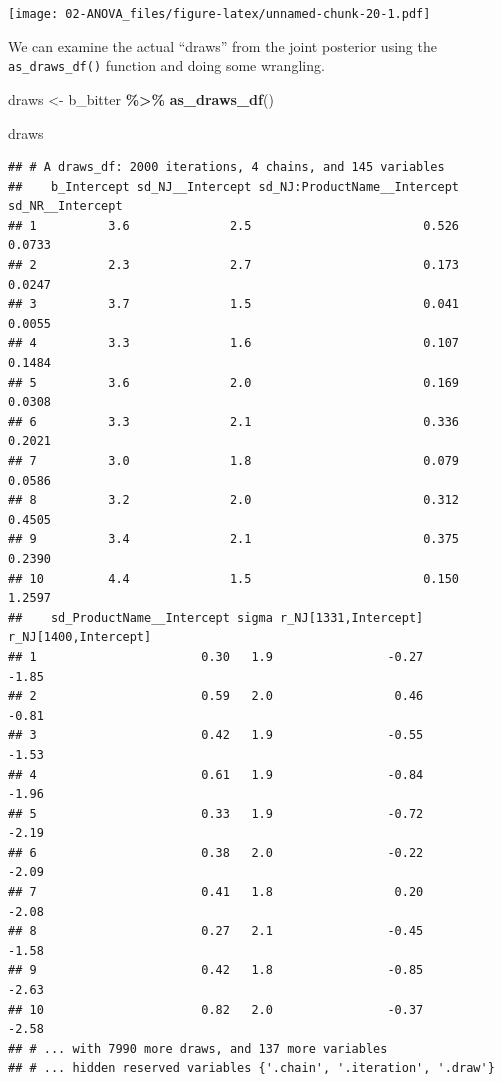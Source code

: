 \documentclass[
]{book}
\newenvironment{Shaded}{\begin{snugshade}}{\end{snugshade}}
\newcommand{\FunctionTok}[1]{\textcolor[rgb]{0.13,0.29,0.53}{\textbf{#1}}}
\newcommand{\NormalTok}[1]{#1}
\newcommand{\OtherTok}[1]{\textcolor[rgb]{0.56,0.35,0.01}{#1}}
\newcommand{\SpecialCharTok}[1]{\textcolor[rgb]{0.81,0.36,0.00}{\textbf{#1}}}
\begin{document}
\texttt{[image: 02-ANOVA\_files/figure-latex/unnamed-chunk-20-1.pdf]}

We can examine the actual ``draws'' from the joint posterior using the \texttt{as\_draws\_df()} function and doing some wrangling.

\begin{Shaded}
\begin{Highlighting}[]
\NormalTok{draws }\OtherTok{\textless{}{-}} 
\NormalTok{  b\_bitter }\SpecialCharTok{\%\textgreater{}\%}
  \FunctionTok{as\_draws\_df}\NormalTok{()}

\NormalTok{draws}
\end{Highlighting}
\end{Shaded}

\begin{verbatim}
## # A draws_df: 2000 iterations, 4 chains, and 145 variables
##    b_Intercept sd_NJ__Intercept sd_NJ:ProductName__Intercept sd_NR__Intercept
## 1          3.6              2.5                        0.526           0.0733
## 2          2.3              2.7                        0.173           0.0247
## 3          3.7              1.5                        0.041           0.0055
## 4          3.3              1.6                        0.107           0.1484
## 5          3.6              2.0                        0.169           0.0308
## 6          3.3              2.1                        0.336           0.2021
## 7          3.0              1.8                        0.079           0.0586
## 8          3.2              2.0                        0.312           0.4505
## 9          3.4              2.1                        0.375           0.2390
## 10         4.4              1.5                        0.150           1.2597
##    sd_ProductName__Intercept sigma r_NJ[1331,Intercept] r_NJ[1400,Intercept]
## 1                       0.30   1.9                -0.27                -1.85
## 2                       0.59   2.0                 0.46                -0.81
## 3                       0.42   1.9                -0.55                -1.53
## 4                       0.61   1.9                -0.84                -1.96
## 5                       0.33   1.9                -0.72                -2.19
## 6                       0.38   2.0                -0.22                -2.09
## 7                       0.41   1.8                 0.20                -2.08
## 8                       0.27   2.1                -0.45                -1.58
## 9                       0.42   1.8                -0.85                -2.63
## 10                      0.82   2.0                -0.37                -2.58
## # ... with 7990 more draws, and 137 more variables
## # ... hidden reserved variables {'.chain', '.iteration', '.draw'}
\end{verbatim}
\end{document}
